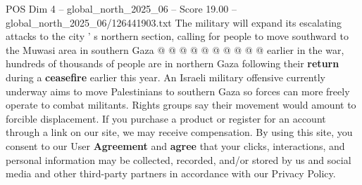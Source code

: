 \begin{textsample}{POS Dim 4 – global\_north\_2025\_06 – Score 19.00 – global\_north\_2025\_06/126441903.txt}
The military will expand its escalating attacks to the city ' s northern section, calling for people to move southward to the Muwasi area in southern Gaza @ @ @ @ @ @ @ @ @ @ earlier in the war, hundreds of thousands of people are in northern Gaza following their \textbf{return} during a \textbf{ceasefire} earlier this year.
An Israeli military offensive currently underway aims to move Palestinians to southern Gaza so forces can more freely operate to combat militants.
Rights groups say their movement would amount to forcible displacement.
If you purchase a product or register for an account through a link on our site, we may receive compensation.
By using this site, you consent to our User \textbf{Agreement} and \textbf{agree} that your clicks, interactions, and personal information may be collected, recorded, and/or stored by us and social media and other third-party partners in accordance with our Privacy Policy.

\end{textsample}
